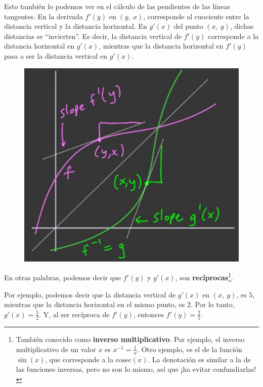 \documentclass[12pt]{article}
\begin{document}
Esto también lo podemos ver en el cálculo de las pendientes de las líneas tangentes. En la derivada $f'(y)$ en $(y, \ x)$, corresponde al cuociente entre la distancia vertical y la distancia horizontal. En $g'(x)$ del punto $(x, \ y)$, dichas distancias se ``invierten''. Es decir, la distancia vertical de $f'(y)$ corresponde a la distancia horizontal en $g'(x)$, mientras que la distancia horizontal en $f'(y)$ pasa a ser la distancia vertical en $g'(x)$.

\begin{figure}[hbt!]
\centering
\includegraphics[scale=0.5]{img/rel-deriv-inv-fun-3.jpg}
\end{figure}

En otras palabras, podemos decir que $f'(y)$ y $g'(x)$, son \textbf{recíprocas}\footnote{También conocido como \textbf{inverso multiplicativo}. Por ejemplo, el inverso multiplicativo de un valor $x$ es $x^{-1} = \frac{1}{x}$. Otro ejemplo, es el de la función $\sin(x)$, que corresponde a la $\text{cosec}(x)$. La denotación es similar a la de las funciones inversas, pero no son lo mismo, así que ¡ha evitar confundiarlas!}.

Por ejemplo, podemos decir que la distancia vertical de $g'(x)$ en $(x, \ y)$, es $5$, mientras que la distancia horizontal en el mismo punto, es $2$. Por lo tanto, $g'(x) = \frac{5}{2}$. Y, al ser recíproca de $f'(y)$, entonces $f'(y) = \frac{2}{5}$.

\newpage
\end{document}
